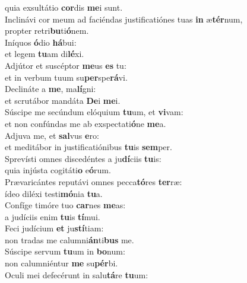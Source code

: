 \oddverse quia exsultátio \textbf{cor}dis \textbf{me}i sunt.\\
\evenverse Inclinávi cor meum ad faciéndas justificatiónes tuas \textbf{in} æ\textbf{tér}num,~\*\\
\evenverse propter retri\textbf{bu}ti\textbf{ó}nem.\\
\oddverse Iníquos \textbf{ó}dio \textbf{há}bui:~\*\\
\oddverse et legem \textbf{tu}am di\textbf{lé}xi.\\
\evenverse Adjútor et suscéptor \textbf{me}us \textbf{es} tu:~\*\\
\evenverse et in verbum tuum su\textbf{per}spe\textbf{rá}vi.\\
\oddverse Declináte a \textbf{me}, ma\textbf{lí}gni:~\*\\
\oddverse et scrutábor mandáta \textbf{De}i \textbf{me}i.\\
\evenverse Súscipe me secúndum elóquium \textbf{tu}um, et \textbf{vi}vam:~\*\\
\evenverse et non confúndas me ab exspectati\textbf{ó}ne \textbf{me}a.\\
\oddverse Adjuva me, et \textbf{sal}vus \textbf{e}ro:~\*\\
\oddverse et meditábor in justificatiónibus \textbf{tu}is \textbf{sem}per.\\
\evenverse Sprevísti omnes discedéntes a ju\textbf{dí}ciis \textbf{tu}is:~\*\\
\evenverse quia injústa cogitáti\textbf{o} e\textbf{ó}rum.\\
\oddverse Prævaricántes reputávi omnes pecca\textbf{tó}res \textbf{ter}ræ:~\*\\
\oddverse ídeo diléxi testi\textbf{mó}nia \textbf{tu}a.\\
\evenverse Confíge timóre tuo \textbf{car}nes \textbf{me}as:~\*\\
\evenverse a judíciis enim \textbf{tu}is \textbf{tí}mui.\\
\oddverse Feci judícium \textbf{et} ju\textbf{stí}tiam:~\*\\
\oddverse non tradas me calumni\textbf{án}ti\textbf{bus} me.\\
\evenverse Súscipe servum \textbf{tu}um in \textbf{bo}num:~\*\\
\evenverse non calumniéntur \textbf{me} su\textbf{pér}bi.\\
\oddverse Oculi mei defecérunt in salu\textbf{tá}re \textbf{tu}um:~\*\\
